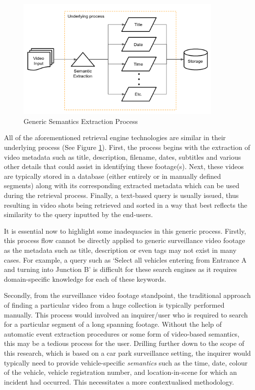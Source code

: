 \begin{figure}[!hbt]\centering
\includegraphics[width=0.9\textwidth]{image/general/simpleframe3.png}
\caption{Generic Semantics Extraction Process}
\label{fig:exampleframework2}
\end{figure}

All of the aforementioned retrieval engine technologies are similar
in their underlying process (See Figure \ref{fig:exampleframework2}). First, the process begins with the extraction of video metadata such as title, description, filename, dates, subtitles and various other details that could assist in identifying these footage(s). Next, these videos are typically stored in a database (either entirely or in manually defined segments) along with its corresponding extracted metadata which can be used during the retrieval process. Finally, a text-based query is usually issued, thus resulting in video shots being retrieved and sorted in a way that best
reflects the similarity to
the query inputted by the end-users.

It is essential now to highlight some inadequacies in this generic process.
Firstly, this process flow cannot be directly applied to generic surveillance video footage as the metadata such as title, description or even tags may not exist in many cases.
For example, a query such as `Select all vehicles entering from Entrance A and turning into Junction B' is difficult for these search engines as it requires domain-specific knowledge for each of these keywords.

Secondly, from the surveillance video footage standpoint, the traditional approach of finding a particular video from a huge collection is typically performed manually. This process would involved an inquirer/user who is required to search for a particular segment of a long spanning footage. Without the help of automatic event extraction procedures or some form of video-based semantics, this may be a tedious process for the user.
Drilling further down to the scope of this research, which is based on a car park surveillance setting, the inquirer would typically need to provide vehicle-specific \textit{semantics} such as the time, date, colour of the vehicle, vehicle registration number, and location-in-scene for which an incident had occurred. This necessitates a more contextualised methodology. %

